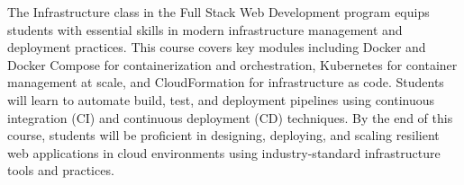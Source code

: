 The Infrastructure class in the Full Stack Web Development program equips students with essential skills in modern infrastructure management and deployment practices.
This course covers key modules including Docker and Docker Compose for containerization and orchestration, Kubernetes for container management at scale, and CloudFormation for infrastructure as code.
Students will learn to automate build, test, and deployment pipelines using continuous integration (CI) and continuous deployment (CD) techniques.
By the end of this course, students will be proficient in designing, deploying, and scaling resilient web applications in cloud environments using industry-standard infrastructure tools and practices.
